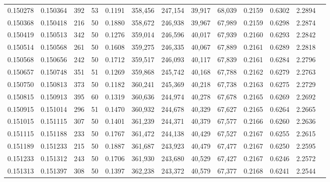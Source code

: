 \begin{tabular}{rrrrrrrrrrrrr}
0.150278 & 0.150364 &   392 &  53 &                                     0.1191 & 358,456 & 247,154 &  39,917 &  68,039 & 0.2159 & 0.6302 & 2.2894 \\
0.150368 & 0.150418 &   216 &  50 &                                     0.1880 & 358,672 & 246,938 &  39,967 &  67,989 & 0.2159 & 0.6298 & 2.2874 \\
0.150419 & 0.150513 &   342 &  50 &                                     0.1276 & 359,014 & 246,596 &  40,017 &  67,939 & 0.2160 & 0.6293 & 2.2842 \\
0.150514 & 0.150568 &   261 &  50 &                                     0.1608 & 359,275 & 246,335 &  40,067 &  67,889 & 0.2161 & 0.6289 & 2.2818 \\
0.150568 & 0.150656 &   242 &  50 &                                     0.1712 & 359,517 & 246,093 &  40,117 &  67,839 & 0.2161 & 0.6284 & 2.2796 \\
0.150657 & 0.150748 &   351 &  51 &                                     0.1269 & 359,868 & 245,742 &  40,168 &  67,788 & 0.2162 & 0.6279 & 2.2763 \\
0.150750 & 0.150813 &   373 &  50 &                                     0.1182 & 360,241 & 245,369 &  40,218 &  67,738 & 0.2163 & 0.6275 & 2.2729 \\
0.150815 & 0.150913 &   395 &  60 &                                     0.1319 & 360,636 & 244,974 &  40,278 &  67,678 & 0.2165 & 0.6269 & 2.2692 \\
0.150915 & 0.151014 &   296 &  51 &                                     0.1470 & 360,932 & 244,678 &  40,329 &  67,627 & 0.2165 & 0.6264 & 2.2665 \\
0.151015 & 0.151115 &   307 &  50 &                                     0.1401 & 361,239 & 244,371 &  40,379 &  67,577 & 0.2166 & 0.6260 & 2.2636 \\
0.151115 & 0.151188 &   233 &  50 &                                     0.1767 & 361,472 & 244,138 &  40,429 &  67,527 & 0.2167 & 0.6255 & 2.2615 \\
0.151189 & 0.151233 &   215 &  50 &                                     0.1887 & 361,687 & 243,923 &  40,479 &  67,477 & 0.2167 & 0.6250 & 2.2595 \\
0.151233 & 0.151312 &   243 &  50 &                                     0.1706 & 361,930 & 243,680 &  40,529 &  67,427 & 0.2167 & 0.6246 & 2.2572 \\
0.151313 & 0.151397 &   308 &  50 &                                     0.1397 & 362,238 & 243,372 &  40,579 &  67,377 & 0.2168 & 0.6241 & 2.2544 \\

\end{tabular}
